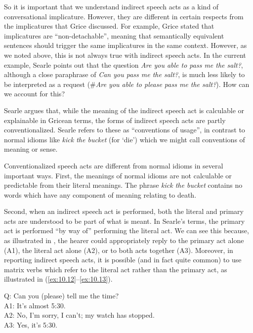 So it is important that we understand indirect speech acts as a kind of conversational implicature. However, they are different in certain respects from the implicatures that Grice discussed. For example, Grice stated that implicatures are “non-detachable”, meaning that semantically equivalent sentences should trigger the same implicatures in the same context. However, as we noted above, this is not always true with indirect speech acts. In the current example, Searle points out that the question \textit{Are you able to pass me the salt?}, although a close paraphrase of \textit{Can you pass me the salt?}, is much less likely to be interpreted as a request (\#\textit{Are you able to please pass me the salt?}). How can we account for this?



Searle argues that, while the meaning of the indirect speech act is calculable or explainable in Gricean terms, the forms of indirect speech acts are partly conventionalized. Searle refers to these as “conventions of usage”, in contrast to normal idioms like \textit{kick the bucket} (for ‘die’) which we might call conventions of meaning or sense.



Conventionalized speech acts are different from normal idioms in several important ways. First, the meanings of normal idioms are not calculable or predictable from their literal meanings. The phrase \textit{kick the bucket} contains no words which have any component of meaning relating to death.



Second, when an indirect speech act is performed, both the literal and primary acts are understood to be part of what is meant. In Searle’s terms, the primary act is performed “by way of” performing the literal act. We can see this because, as illustrated in , the hearer could appropriately reply to the primary act alone (A1), the literal act alone (A2), or to both acts together (A3). Moreover, in reporting indirect speech acts, it is possible (and in fact quite common) to use matrix verbs which refer to the literal act rather than the primary act, as illustrated in (\ref{ex:10.12}--\ref{ex:10.13}).


\ea \label{ex:10.11}
Q: Can you (please) tell me the time?\\
A1: It’s almost 5:30.\\
A2: No, I’m sorry, I can’t; my watch has stopped.\\
A3: Yes, it’s 5:30.
\z

